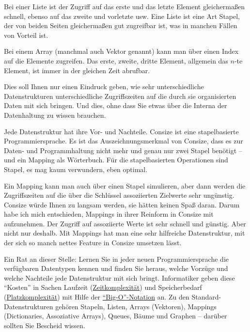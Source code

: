Bei einer Liste ist der Zugriff auf das erste und das letzte Element gleichermaßen schnell, ebenso auf das zweite und vorletzte usw. Eine Liste ist eine Art Stapel, der von beiden Seiten gleichermaßen gut zugreifbar ist, was in manchen Fällen von Vorteil ist.

Bei einem Array (manchmal auch Vektor genannt) kann man über einen Index auf die Elemente zugreifen. Das erste, zweite, dritte Element, allgemein das $n$-te Element, ist immer in der gleichen Zeit abrufbar.

Dies soll Ihnen nur einen Eindruck geben, wie sehr unterschiedliche Datenstrukturen unterschiedliche Zugriffszeiten auf die durch sie organisierten Daten mit sich bringen. Und dies, ohne dass Sie etwas über die Interna der Datenhaltung zu wissen brauchen.

Jede Datenstruktur hat ihre Vor- und Nachteile. Consize ist eine stapelbasierte Programmiersprache. Es ist das Auszeichnungsmerkmal von Consize, dass es zur Daten- und Programmhaltung nicht mehr und genau nur zwei Stapel benötigt -- und ein Mapping als Wörterbuch. Für die stapelbasierten Operationen sind Stapel, es mag kaum verwundern, eben optimal.

Ein Mapping kann man auch über einen Stapel simulieren, aber dann werden die Zugriffszeiten auf die über die Schlüssel assoziierten Zielwerte sehr ungünstig. Consize würde Ihnen zu langsam werden, sie hätten keinen Spaß daran. Darum habe ich mich entschieden, Mappings in ihrer Reinform in Consize mit aufzunehmen. Der Zugriff auf assoziierte Werte ist sehr schnell und günstig. Aber nicht nur deshalb. Mit Mappings hat man eine sehr hilfreiche Datenstruktur, mit der sich so manch nettes Feature in Consize umsetzen lässt.

Ein Rat an dieser Stelle: Lernen Sie in jeder neuen Programmiersprache die verfügbaren Datentypen kennen und finden Sie heraus, welche Vorzüge und welche Nachteile jede Datenstruktur mit sich bringt. Informatiker geben diese "`Kosten"' in Sachen Laufzeit (\href{http://de.wikipedia.org/wiki/Zeitkomplexit\%C3\%A4t}{Zeitkomplexität}) und Speicherbedarf (\href{http://de.wikipedia.org/wiki/Platzkomplexit\%C3\%A4t}{Platzkomplexität})
mit Hilfe der \href{http://en.wikipedia.org/wiki/Big\_O\_notation}{"`Big-O"'-Notation} an.
Zu den Standard-Datenstrukturen gehören Stapeln, Listen, Arrays (Vektoren), Mappings (Dictionaries, Assoziative Arrays), Queues, Bäume und Graphen -- darüber sollten Sie Bescheid wissen. 

